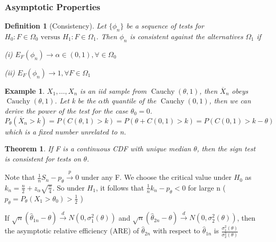 \documentclass{ctexart}
\newtheorem{theorem}{Theorem}[subsection]
\newtheorem{definition}{Definition}[subsection]
\newtheorem{example}{Example}[subsection]
\begin{document}
\subsubsection{Asymptotic Properties}
\begin{definition}[Consistency]
  Let \(\{\phi_{n}\}\) be a sequence of tests for \(H_{0}:F\in \Omega_{0}\text{ versus }H_{1}:F\in \Omega_{1}\). Then \(\phi_{n}\) is consistent against the 
  alternatives \(\Omega_{1}\) if 
  
  (i) \(E_{F}(\phi_{n})\to \alpha\in (0,1),\forall \in \Omega_{0}\) 

  (ii) \(E_{F}(\phi_{n})\to 1,\forall F\in \Omega_{1}\) 
\end{definition}
\begin{example}
  \(X_{1},\ldots,X_{n}\) is an iid sample from \(\operatorname{Cauchy}(\theta,1)\), then \(\overline{X}_{n}\) obeys \(\operatorname{Cauchy}(\theta,1)\). Let k be the \(\alpha\)th quantile of the \(\operatorname{Cauchy}(0,1)\), then we can derive the power of the test for the case \(\theta_{0}=0\). 
  \[
  P_{\theta}(\overline{X}_{n}>k)=P(C(\theta,1)>k)=P(\theta+C(0,1)>k)=P(C(0,1)>k-\theta)
  \]        
  which is a fixed number unrelated to n. 
\end{example}
\begin{theorem}
  If F is a continuous CDF with unique median \(\theta  \), then the sign test is consistent for tests on \(\theta\).   
\end{theorem}
Note that \(\frac{1}{n}S_{n}-p_{\theta}\xrightarrow{p}0\) under any F. We choose the critical value under \(H_{0}\) as \(k_{n}=\frac{n}{2}+z_{\alpha}\sqrt{\frac{n}{4}}\). So under \(H_{1}\), it follows that \(\frac{1}{n}k_{n}-p_{\theta}<0\) for large n (\(p_{\theta}=P_{\theta}(X_{1}>\theta_{0})>\frac{1}{2}\) )     

If \(\sqrt{n}(\hat{\theta}_{1n}-\theta)\xrightarrow{d}N(0,\sigma_{1}^{2}(\theta))\) and \(\sqrt{n}(\hat{\theta}_{2n}-\theta)\xrightarrow{d}N(0,\sigma_{2}^{2}(\theta))\), then the asymptotic relative efficiency (ARE) of \(\hat{\theta}_{2n}\) with respect to \(\hat{\theta}_{1n}\) is \(\frac{\sigma_{1}^{2}(\theta)}{\sigma_{2}^{2}(\theta)}\)   
\end{document}
